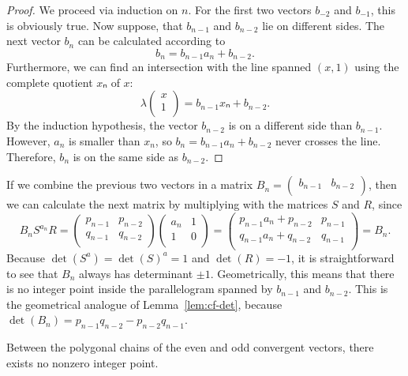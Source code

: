\begin{proof}
  We proceed via induction on $n$.
  For the first two vectors $b_{-2}$ and $b_{-1}$, this is obviously true.
  Now suppose, that $b_{n-1}$ and $b_{n-2}$ lie on different sides.
  The next vector $b_n$ can be calculated according to
  \[
    b_n = b_{n-1} a_n + b_{n-2}.
  \]
  Furthermore, we can find an intersection with the line spanned $(x, 1)$ using
  the complete quotient $xₙ$ of $x$:
  \[
    λ
    \begin{pmatrix}
      x \\
      1 \\
    \end{pmatrix}
    = b_{n-1} xₙ + b_{n-2}.
  \]
  By the induction hypothesis, the vector $b_{n-2}$ is on a different side than $b_{n-1}$.
  However, $a_n$ is smaller than $x_n$, so $b_n = b_{n-1} a_n + b_{n-2}$ never crosses the line.
  Therefore, $b_n$ is on the same side as $b_{n-2}$.
\end{proof}

If we combine the previous two vectors in a matrix $B_n = \begin{pmatrix}
  b_{n-1} & b_{n-2} \\
\end{pmatrix}$,
then we can calculate the next matrix by multiplying with the matrices $S$ and $R$, since
\[
  B_n S^{a_n} R =
  \begin{pmatrix}
    p_{n-1} & p_{n-2} \\
    q_{n-1} & q_{n-2} \\
  \end{pmatrix}
  \begin{pmatrix}
    a_n & 1 \\
    1   & 0 \\
  \end{pmatrix}
  =
  \begin{pmatrix}
    p_{n-1} a_n + p_{n-2} & p_{n-1} \\
    q_{n-1} a_n + q_{n-2} & q_{n-1} \\
  \end{pmatrix}
  =
  B_n.
\]
Because $\det(S^a) = \det(S)^a = 1$ and $\det(R) = -1$, it is straightforward to
see that $B_n$ always has determinant $±1$.
Geometrically, this means that there is no integer point inside the
parallelogram spanned by $b_{n-1}$ and $b_{n-2}$.
This is the geometrical analogue of Lemma~\ref{lem:cf-det},
because $\det(B_n) = p_{n-1} q_{n-2} - p_{n-2} q_{n-1}$.

\begin{lemma}
  \label{lem:klein-empty}
  Between the polygonal chains of the even and odd convergent vectors,
  there exists no nonzero integer point.
\end{lemma}

